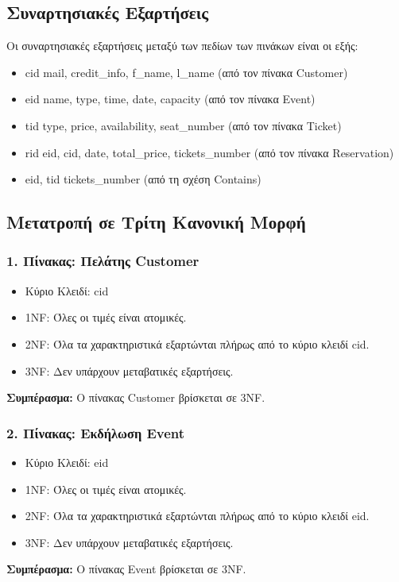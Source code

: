 \documentclass{article}
\begin{document}
\subsection*{Συναρτησιακές Εξαρτήσεις}
Οι συναρτησιακές εξαρτήσεις μεταξύ των πεδίων των πινάκων είναι οι εξής:
\begin{itemize}
    \item cid \rightarrow mail, credit\_info, f\_name, l\_name (από τον πίνακα Customer)
    \item eid \rightarrow name, type, time, date, capacity (από τον πίνακα Event)
    \item tid \rightarrow type, price, availability, seat\_number (από τον πίνακα Ticket)
    \item rid \rightarrow eid, cid, date, total\_price, tickets\_number (από τον πίνακα Reservation)
    \item eid, tid \rightarrow tickets\_number (από τη σχέση Contains)
\end{itemize}

\subsection*{Μετατροπή σε Τρίτη Κανονική Μορφή}
\subsubsection*{1. Πίνακας: Πελάτης Customer}
\begin{itemize}
    \item Κύριο Κλειδί: cid
    \item 1NF: Όλες οι τιμές είναι ατομικές.
    \item 2NF: Όλα τα χαρακτηριστικά εξαρτώνται πλήρως από το κύριο κλειδί cid.
    \item 3NF: Δεν υπάρχουν μεταβατικές εξαρτήσεις.
\end{itemize}
\textbf{Συμπέρασμα:} Ο πίνακας Customer βρίσκεται σε 3NF.

\subsubsection*{2. Πίνακας: Εκδήλωση Event}
\begin{itemize}
    \item Κύριο Κλειδί: eid
    \item 1NF: Όλες οι τιμές είναι ατομικές.
    \item 2NF: Όλα τα χαρακτηριστικά εξαρτώνται πλήρως από το κύριο κλειδί eid.
    \item 3NF: Δεν υπάρχουν μεταβατικές εξαρτήσεις.
\end{itemize}
\textbf{Συμπέρασμα:} Ο πίνακας Event βρίσκεται σε 3NF.
\end{document}
